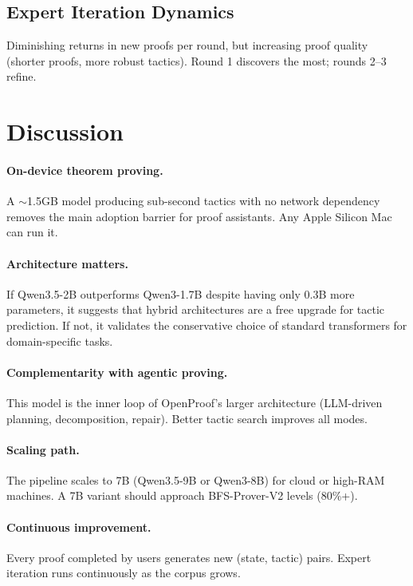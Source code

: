 \documentclass[11pt,a4paper]{article}
\begin{document}
\subsection{Expert Iteration Dynamics}

Diminishing returns in new proofs per round, but increasing proof quality (shorter proofs, more robust tactics). Round 1 discovers the most; rounds 2--3 refine.

\section{Discussion}
\label{sec:discussion}

\paragraph{On-device theorem proving.} A $\sim$1.5GB model producing sub-second tactics with no network dependency removes the main adoption barrier for proof assistants. Any Apple Silicon Mac can run it.

\paragraph{Architecture matters.} If Qwen3.5-2B outperforms Qwen3-1.7B despite having only 0.3B more parameters, it suggests that hybrid architectures are a free upgrade for tactic prediction. If not, it validates the conservative choice of standard transformers for domain-specific tasks.

\paragraph{Complementarity with agentic proving.} This model is the inner loop of OpenProof's larger architecture (LLM-driven planning, decomposition, repair). Better tactic search improves all modes.

\paragraph{Scaling path.} The pipeline scales to 7B (Qwen3.5-9B or Qwen3-8B) for cloud or high-RAM machines. A 7B variant should approach BFS-Prover-V2 levels (80\%+).

\paragraph{Continuous improvement.} Every proof completed by users generates new (state, tactic) pairs. Expert iteration runs continuously as the corpus grows.
\end{document}
